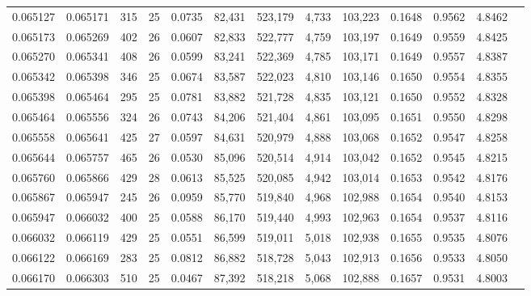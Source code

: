\begin{tabular}{rrrrrrrrrrrrr}
0.065127 & 0.065171 & 315 &  25 &                                     0.0735 &  82,431 & 523,179 &   4,733 & 103,223 & 0.1648 & 0.9562 & 4.8462 \\
0.065173 & 0.065269 & 402 &  26 &                                     0.0607 &  82,833 & 522,777 &   4,759 & 103,197 & 0.1649 & 0.9559 & 4.8425 \\
0.065270 & 0.065341 & 408 &  26 &                                     0.0599 &  83,241 & 522,369 &   4,785 & 103,171 & 0.1649 & 0.9557 & 4.8387 \\
0.065342 & 0.065398 & 346 &  25 &                                     0.0674 &  83,587 & 522,023 &   4,810 & 103,146 & 0.1650 & 0.9554 & 4.8355 \\
0.065398 & 0.065464 & 295 &  25 &                                     0.0781 &  83,882 & 521,728 &   4,835 & 103,121 & 0.1650 & 0.9552 & 4.8328 \\
0.065464 & 0.065556 & 324 &  26 &                                     0.0743 &  84,206 & 521,404 &   4,861 & 103,095 & 0.1651 & 0.9550 & 4.8298 \\
0.065558 & 0.065641 & 425 &  27 &                                     0.0597 &  84,631 & 520,979 &   4,888 & 103,068 & 0.1652 & 0.9547 & 4.8258 \\
0.065644 & 0.065757 & 465 &  26 &                                     0.0530 &  85,096 & 520,514 &   4,914 & 103,042 & 0.1652 & 0.9545 & 4.8215 \\
0.065760 & 0.065866 & 429 &  28 &                                     0.0613 &  85,525 & 520,085 &   4,942 & 103,014 & 0.1653 & 0.9542 & 4.8176 \\
0.065867 & 0.065947 & 245 &  26 &                                     0.0959 &  85,770 & 519,840 &   4,968 & 102,988 & 0.1654 & 0.9540 & 4.8153 \\
0.065947 & 0.066032 & 400 &  25 &                                     0.0588 &  86,170 & 519,440 &   4,993 & 102,963 & 0.1654 & 0.9537 & 4.8116 \\
0.066032 & 0.066119 & 429 &  25 &                                     0.0551 &  86,599 & 519,011 &   5,018 & 102,938 & 0.1655 & 0.9535 & 4.8076 \\
0.066122 & 0.066169 & 283 &  25 &                                     0.0812 &  86,882 & 518,728 &   5,043 & 102,913 & 0.1656 & 0.9533 & 4.8050 \\
0.066170 & 0.066303 & 510 &  25 &                                     0.0467 &  87,392 & 518,218 &   5,068 & 102,888 & 0.1657 & 0.9531 & 4.8003 \\

\end{tabular}
